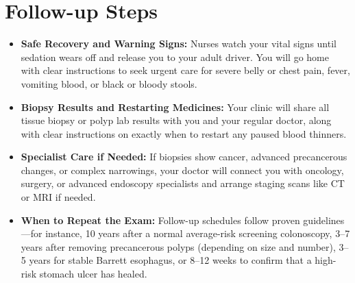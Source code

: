 \section{Follow-up Steps}
\begin{itemize}
\item \textbf{Safe Recovery and Warning Signs:} Nurses watch your vital signs until sedation wears off and release you to your adult driver. You will go home with clear instructions to seek urgent care for severe belly or chest pain, fever, vomiting blood, or black or bloody stools.
\item \textbf{Biopsy Results and Restarting Medicines:} Your clinic will share all tissue biopsy or polyp lab results with you and your regular doctor, along with clear instructions on exactly when to restart any paused blood thinners.
\item \textbf{Specialist Care if Needed:} If biopsies show cancer, advanced precancerous changes, or complex narrowings, your doctor will connect you with oncology, surgery, or advanced endoscopy specialists and arrange staging scans like CT or MRI if needed.
\item \textbf{When to Repeat the Exam:} Follow-up schedules follow proven guidelines---for instance, 10 years after a normal average-risk screening colonoscopy, 3--7 years after removing precancerous polyps (depending on size and number), 3--5 years for stable Barrett esophagus, or 8--12 weeks to confirm that a high-risk stomach ulcer has healed.
\end{itemize}


